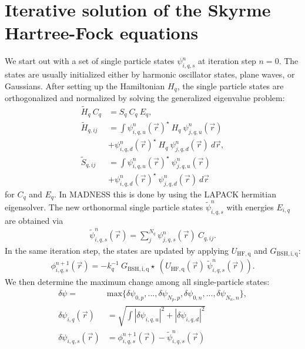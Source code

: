 \documentclass[4p]{elsarticle}
\begin{document}
\section{Iterative solution of the Skyrme Hartree-Fock equations}
\label{equations}
We start out with a set of single particle states $\psi_{i,q,s}^{n}$ at iteration step $n=0$. The states are usually initialized either by harmonic oscillator states, plane waves, or Gaussians. 
After setting up the Hamiltonian $H_q$, the single particle states are orthogonalized and normalized by solving the generalized eigenvalue problem: 
\begin{align}
\tilde{H}_q \: C_q &= S_q \: C_q \: E_q , \nonumber\\
\tilde{H}_{q,ij} &= \int \psi_{i,q,u}^n (\vec{r})^\star \: H_q \: \psi_{j,q,u}^n (\vec{r}) \nonumber\\
&+ \psi_{i,q,d}^n (\vec{r})^\star \: H_q \: \psi_{j,q,d}^n (\vec{r}) \: d \vec{r}, \\
\tilde{S}_{q,ij} &= \int \psi_{i,q,u}^n (\vec{r})^\star\: \psi_{j,q,u}^n (\vec{r})  \nonumber\\
&+ \psi_{i,q,d}^n (\vec{r})^\star\: \psi_{j,q,d}^n (\vec{r}) \: d \vec{r} 
\label{SCE}
\end{align} 
for $C_q$ and $E_q$. In \textsc{MADNESS} this is done by using the LAPACK hermitian eigensolver. The new orthonormal single particle states $\tilde{\psi}_{i,q,s}^n$ with energies $E_{i,q}$ are obtained via
\begin{align}
\tilde{\psi}_{i,q,s}^n (\vec{r}) =  \sum\nolimits_{j}^{N_q} \psi_{j,q,s}^n (\vec{r}) \: C_{q,ij} .
\end{align}
In the same iteration step, the states are updated by applying $U_\mathrm{HF,q}$ and $G_\mathrm{BSH,i,q}$:
\begin{align}
\phi_{i,q,s}^{n+1} (\vec{r}) = - k_q^{-1} \: G_\mathrm{BSH,i,q} \star \: \left( U_\mathrm{HF,q} (\vec{r}) \: \tilde{\psi}_{i,q,s}^{n} (\vec{r}) \right).
\end{align} 
We then determine the maximum change among all single-particle states:  
\begin{align}
\delta \psi =& \mathrm{max} \{ \delta \psi_{0,p}, ..., \delta \psi_{N_p,p}, \delta \psi_{0,n}, ..., \delta \psi_{N_n,n} \},  \\
\delta \psi_{i,q}(\vec{r})   & = \sqrt{ \int \left| \delta \psi_{i,q,u} \right|^2 + \left| \delta \psi_{i,q,d} \right|^2} \\
\delta \psi_{i,q,s}(\vec{r}) &= \phi_{i,q,s}^{n+1} (\vec{r}) - \tilde{\psi}_{i,q,s}^{n} (\vec{r}) 
\label{convergence}
\end{align}
\end{document}
